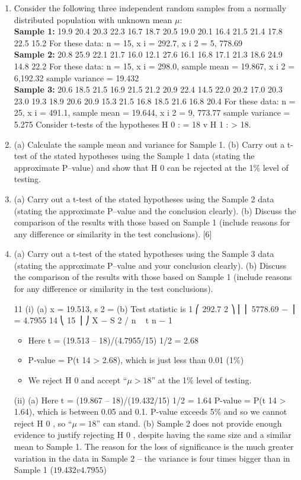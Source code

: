 \documentclass[a4paper,12pt]{article}
\begin{document}
\begin{enumerate}
\item %
Consider the following three independent random samples from a normally distributed population with unknown mean $\mu$:
\\
\noindent \textbf{Sample 1:}
19.9 20.4 20.3 22.3 16.7 18.7 20.5 19.0 20.1 16.4 21.5 21.4 17.8 22.5 15.2
For these data: n = 15,
\sum x i = 292.7,
\sum x i 2 = 5, 778.69
\\
\noindent \textbf{Sample 2:}
20.8 25.9 22.1 21.7 16.0 12.1 27.6 16.1 16.8 17.1 21.3 18.6 24.9 14.8 22.2
For these data: n = 15,
\sum x i = 298.0,
sample mean = 19.867,
\sum x i 2 = 6,192.32
sample variance = 19.432
\\
\noindent \textbf{Sample 3:}
20.6 18.5 21.5 16.9 21.5 21.2 20.9 22.4 14.5 22.0 20.2 17.0 20.3 23.0 19.3
18.9 20.6 20.9 15.3 21.5 16.8 18.5 21.6 16.8 20.4
For these data: n = 25, \sum x i = 491.1,
sample mean = 19.644,
\sum x i 2 = 9, 773.77
sample variance = 5.275
Consider t-tests of the hypotheses H 0 : \mu = 18 v H 1 : \mu > 18.
\item 

(a) Calculate the sample mean and variance for Sample 1.
(b) Carry out a t-test of the stated hypotheses using the Sample 1 data (stating the approximate P–value) and show that H 0 can be rejected at the 1\% level of testing.
\item 
(a) Carry out a t-test of the stated hypotheses using the Sample 2 data (stating the approximate P–value and the conclusion clearly).
(b) Discuss the comparison of the results with those based on Sample 1 (include reasons for any difference or similarity in the test
conclusions).
[6]
\item 
(a) Carry out a t-test of the stated hypotheses using the Sample 3 data (stating the approximate P–value and your conclusion clearly).
(b) Discuss the comparison of the results with those based on Sample 1 (include reasons for any difference or similarity in the test
conclusions).

\newpage

11
(i)
(a) x = 19.513, s 2 =
(b) Test statistic is
1 ⎛
292.7 2 ⎞
⎜ ⎜ 5778.69 −
⎟ = 4.7955
14 ⎝
15 ⎟ ⎠
X −\mu
S 2 / n
~ t n − 1
\begin{itemize}
\item Here t = (19.513 – 18)/(4.7955/15) 1/2 = 2.68
\item P-value = P(t 14 > 2.68), which is just less than 0.01 (1\%)
\item We reject H 0 and accept “$\mu > 18$” at the 1\% level of testing.
\end{itemize}
(ii)
(a)
Here t = (19.867 – 18)/(19.432/15) 1/2 = 1.64
P-value = P(t 14 > 1.64), which is between 0.05 and 0.1.
P-value exceeds 5\% and so we cannot reject H 0 , so “$\mu = 18$” can stand.
(b)
Sample 2 does not provide enough evidence to justify rejecting H 0 , despite having the same size and a similar mean to Sample 1.
The reason for the loss of significance is the much greater variation in the data in Sample 2 – the variance is four times bigger than in Sample 1 ($19.432 v 4.7955$)


\end{enumerate}
\end{document}

